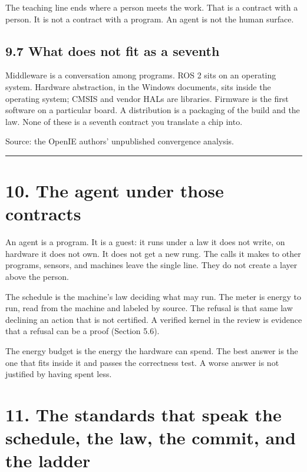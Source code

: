 \documentclass[10pt,letterpaper]{article}
\begin{document}
The teaching line ends where a person meets the work. That is a contract
with a person. It is not a contract with a program. An agent is not the
human surface.

\subsection{9.7 What does not fit as a
seventh}\label{what-does-not-fit-as-a-seventh}

Middleware is a conversation among programs. ROS 2 sits on an operating
system. Hardware abstraction, in the Windows documents, sits inside the
operating system; CMSIS and vendor HALs are libraries. Firmware is the
first software on a particular board. A distribution is a packaging of
the build and the law. None of these is a seventh contract you translate
a chip into.

Source: the OpenIE authors' unpublished convergence analysis.

\begin{center}\rule{0.5\linewidth}{0.5pt}\end{center}

\section{10. The agent under those
contracts}\label{the-agent-under-those-contracts}

An agent is a program. It is a guest: it runs under a law it does not
write, on hardware it does not own. It does not get a new rung. The
calls it makes to other programs, sensors, and machines leave the single
line. They do not create a layer above the person.

The schedule is the machine's law deciding what may run. The meter is
energy to run, read from the machine and labeled by source. The refusal
is that same law declining an action that is not certified. A verified
kernel in the review is evidence that a refusal can be a proof (Section
5.6).

The energy budget is the energy the hardware can spend. The best answer
is the one that fits inside it and passes the correctness test. A worse
answer is not justified by having spent less.

\section{11. The standards that speak the schedule, the law, the commit,
and the
ladder}\label{the-standards-that-speak-the-schedule-the-law-the-commit-and-the-ladder}
\end{document}
